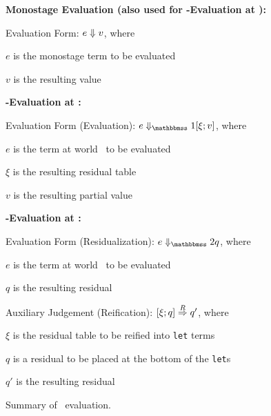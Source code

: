 
\begin{figure}
\begin{abstrsyn}

\textbf{Monostage Evaluation (also used for \bbone-Evaluation at \bbonep):}

\hspace{2em} Evaluation Form: ${e} \Downarrow {v}$, where 
	
	\hspace{4em} $e$ is the monostage term to be evaluated
	
	\hspace{4em} $v$ is the resulting value

\textbf{\bbone-Evaluation at \bbonem:}

\hspace{2em} Evaluation Form (Evaluation): $\diaone e {\xi;v}$, where 
	
	\hspace{4em} $e$ is the term at world \bbonem\ to be evaluated

	\hspace{4em} $\xi$ is the resulting residual table
	
	\hspace{4em} $v$ is the resulting partial value

\textbf{\bbone-Evaluation at \bbtwo:}

\hspace{2em} Evaluation Form (Residualization): $\diatwo e q$, where 
	
	\hspace{4em} $e$ is the term at world \bbtwo\ to be evaluated

	\hspace{4em} $q$ is the resulting residual

\hspace{2em} Auxiliary Judgement (Reification): $[{\xi};{q}]\overset{R}\Rightarrow{q}'$, where 
	
	\hspace{4em} $\xi$ is the residual table to be reified into \texttt{let} terms

	\hspace{4em} $q$ is a residual to be placed at the bottom of the \texttt{let}s

	\hspace{4em} $q'$ is the resulting residual

\end{abstrsyn}
\caption{Summary of \lang\ evaluation.}
\label{fig:dynamicsSummary}
\end{figure}

